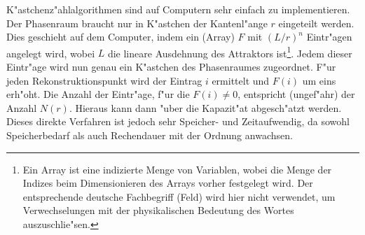 K"astchenz"ahlalgorithmen sind auf Computern sehr einfach zu implementieren. Der
Phasenraum braucht nur in K"astchen der Kantenl"ange $r$ eingeteilt werden\footnotemark.
Dies geschieht auf dem Computer, indem ein \begriff(Array) $F$ mit $(L/r)^n$ Eintr"agen
angelegt wird, wobei $L$ die lineare Ausdehnung des Attraktors ist\footnote{Ein Array ist
  eine indizierte Menge von Variablen, wobei die Menge der Indizes beim Dimensionieren des
  Arrays vorher festgelegt wird. Der entsprechende deutsche Fachbegriff \naja(Feld) wird
  hier nicht verwendet, um Verwechselungen mit der physikalischen Bedeutung des Wortes
  auszuschlie"sen.}. Jedem dieser Eintr"age wird nun genau ein K"astchen des Phasenraumes
zugeordnet. F"ur jeden Rekonstruktionspunkt wird der Eintrag $i$ ermittelt und $F(i)$ um
eins erh"oht. Die Anzahl der Eintr"age, f"ur die $F(i)\neq 0$, entspricht (ungef"ahr) der
Anzahl $N(r)$. Hieraus kann dann "uber  die Kapazit"at abgesch"atzt
werden. Dieses direkte Verfahren ist jedoch sehr Speicher- und Zeitaufwendig, da sowohl
Speicherbedarf als auch Rechendauer mit der Ordnung  anwachsen.


